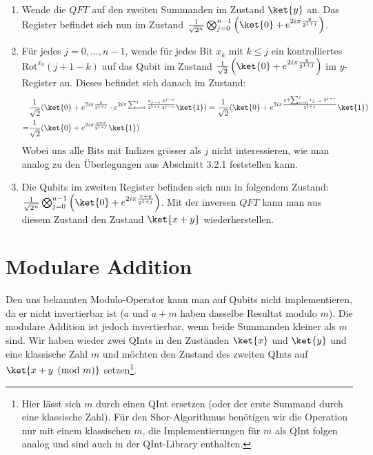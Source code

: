 \begin{enumerate}
    \item Wende die $QFT$ auf den zweiten Summanden im Zustand $\ket{y}$ an. Das Register befindet sich nun im Zustand $\frac{1}{\sqrt{2^n}}\bigotimes_{j = 0}^{n - 1}\left(\ket{0} + e^{2i\pi\frac{y}{2^{1 + j}}}\right)$.
    \item Für jedes $j = 0, ..., n - 1$, wende für jedes Bit $x_k$ mit $k \leq j$ ein kontrolliertes $\text{Rot}^{x_k}(j + 1 - k)$ auf das Qubit im Zustand $\frac{1}{\sqrt{2}}\left(\ket{0} + e^{2i\pi\frac{y}{2^{1 + j}}}\right)$ im $y$-Register an. Dieses befindet sich danach im Zustand:
    \begin{align*}
        &\frac{1}{\sqrt{2}}(\ket{0} + e^{2i\pi\frac{y}{2^{1 + j}}}\cdot e^{2i\pi\sum_{s = 0}^{j}\frac{x_{j - s}\cdot 2^{j - s}}{2^{1 + s}\cdot2^{j - s}}}\ket{1}) 
        = \frac{1}{\sqrt{2}}(\ket{0} + e^{2i\pi\frac{y + \sum_{s = 0}^{j}{x_{j - s}\cdot2^{j - s}}}{2^{1 + j}}}\ket{1}) \\ = &\frac{1}{\sqrt{2}}(\ket{0} + e^{2i\pi\frac{y + x}{2^{1 + j}}}\ket{1})
    \end{align*}
    Wobei uns alle Bits mit Indizes grösser als $j$ nicht interessieren, wie man analog zu den Überlegungen aus Abschnitt 3.2.1 feststellen kann.
    \item Die Qubits im zweiten Register befinden sich nun in folgendem Zustand: $\frac{1}{\sqrt{2^n}}\bigotimes_{j = 0}^{n - 1}\left(\ket{0} + e^{2i\pi\frac{x + y}{2^{1 + j}}}\right)$. Mit der inversen $QFT$ kann man aus diesem Zustand den Zustand $\ket{x + y}$ wiederherstellen.
\end{enumerate}
\section{Modulare Addition}
Den uns bekannten Modulo-Operator kann man auf Qubits nicht implementieren, da er nicht invertierbar ist ($a$ und $a + m$ haben dasselbe Resultat modulo $m$). Die modulare Addition ist jedoch invertierbar, wenn beide Summanden kleiner als $m$ sind. Wir haben wieder zwei QInts in den Zuständen $\ket{x}$ und $\ket{y}$ und eine klassische Zahl $m$ und möchten den Zustand des zweiten QInts auf $\ket{x + y \pmod{m}}$ setzen\footnote{Hier lässt sich $m$ durch einen QInt ersetzen (oder der erste Summand durch eine klassische Zahl). Für den Shor-Algorithmus benötigen wir die Operation nur mit einem klassischen $m$, die Implementierungen für $m$ als QInt folgen analog und sind auch in der QInt-Library enthalten.}.

